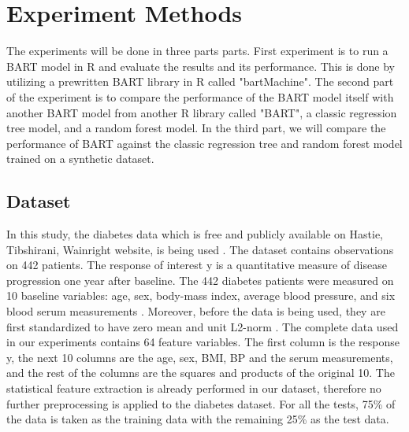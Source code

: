 \documentclass{usiinftr}
\begin{document}
\section{Experiment Methods}
The experiments will be done in three parts parts. First experiment is to run a BART model in R and evaluate the results and its performance. This is done by utilizing a prewritten BART library in R called "bartMachine". The second part of the experiment is to compare the performance of the BART model itself with another BART model from another R library called "BART", a classic regression tree model, and a random forest model. In the third part, we will compare the performance of BART against the classic regression tree and random forest model trained on a synthetic dataset.

\subsection{Dataset}\label{dataset}
In this study, the diabetes data which is free and publicly available on Hastie, Tibshirani,
Wainright website, is being used \cite{24}. The dataset contains observations on 442 patients. The response of interest y is a quantitative measure of disease progression one year after baseline. The 442 diabetes patients were measured on 10 baseline variables:  age, sex, body-mass index, average blood pressure, and six blood serum measurements \cite{24}. Moreover, before the data is being used, they are first standardized to have zero mean and unit L2-norm \cite{24}. The complete data used in our experiments contains 64 feature variables. The first column is the response y, the next 10 columns are the age, sex, BMI, BP and the serum measurements, and the rest of the columns are the squares and products of the original 10. The statistical feature extraction is already performed in our dataset, therefore no further preprocessing is applied to the diabetes dataset. For all the tests, 75\% of the data is taken as the training data with the remaining 25\% as the test data.
\end{document}
